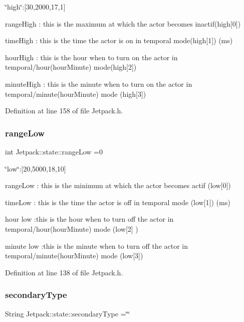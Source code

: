 \char`\"{}high\char`\"{}\+:\mbox{[}30,2000,17,1\mbox{]}

range\+High \+: this is the maximum at which the actor becomes inactif(high\mbox{[}0\mbox{]})

time\+High \+: this is the time the actor is on in temporal mode(high\mbox{[}1\mbox{]}) (ms)

hour\+High \+: this is the hour when to turn on the actor in temporal/hour(hour\+Minute) mode(high\mbox{[}2\mbox{]})

minute\+High \+: this is the minute when to turn on the actor in temporal/minute(hour\+Minute) mode (high\mbox{[}3\mbox{]}) 

Definition at line 158 of file Jetpack.\+h.

\mbox{\label{struct_jetpack_1_1state_ad0343b4fd5740c9c1b0876b27f84ace5}} 
\subsubsection{\texorpdfstring{range\+Low}{rangeLow}}
{\footnotesize\ttfamily int Jetpack\+::state\+::range\+Low =0}

\char`\"{}low\char`\"{}\+:\mbox{[}20,5000,18,10\mbox{]}

range\+Low \+: this is the minimum at which the actor becomes actif (low\mbox{[}0\mbox{]})

time\+Low \+: this is the time the actor is off in temporal mode (low\mbox{[}1\mbox{]}) (ms)

hour low \+:this is the hour when to turn off the actor in temporal/hour(hour\+Minute) mode (low\mbox{[}2\mbox{]} )

minute low \+:this is the minute when to turn off the actor in temporal/minute(hour\+Minute) mode (low\mbox{[}3\mbox{]}) 

Definition at line 138 of file Jetpack.\+h.

\mbox{\label{struct_jetpack_1_1state_a81cf9af139da095b7d91e2a87e50135b}} 
\subsubsection{\texorpdfstring{secondary\+Type}{secondaryType}}
{\footnotesize\ttfamily String Jetpack\+::state\+::secondary\+Type =\char`\"{}\char`\"{}}



